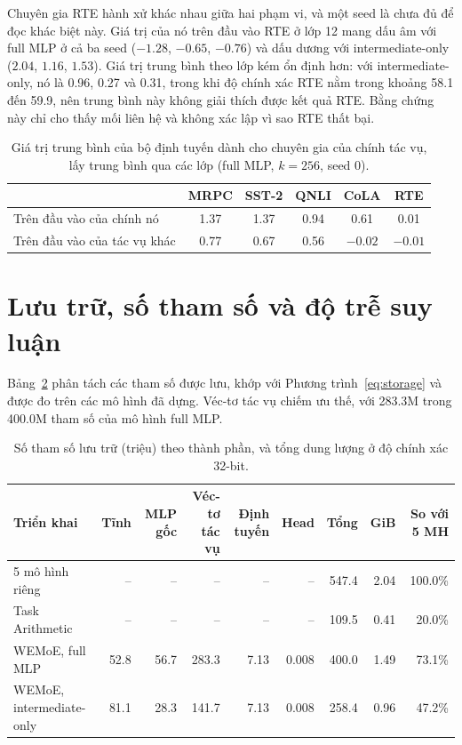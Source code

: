 Chuyên gia RTE hành xử khác nhau giữa hai phạm vi, và một seed là chưa đủ để đọc khác biệt này. Giá trị của nó trên đầu vào RTE ở lớp 12 mang dấu âm với full MLP ở cả ba seed ($-1.28$, $-0.65$, $-0.76$) và dấu dương với intermediate-only ($2.04$, $1.16$, $1.53$). Giá trị trung bình theo lớp kém ổn định hơn: với intermediate-only, nó là 0.96, 0.27 và 0.31, trong khi độ chính xác RTE nằm trong khoảng 58.1 đến 59.9, nên trung bình này không giải thích được kết quả RTE. Bằng chứng này chỉ cho thấy mối liên hệ và không xác lập vì sao RTE thất bại.

\begin{table}[htbp]
  \centering\tablestyle
  \caption{Giá trị trung bình của bộ định tuyến dành cho chuyên gia của chính tác vụ, lấy trung bình qua các lớp (full MLP, $k=256$, seed 0).}
  \label{tab:own}
  \begin{tabular}{l c c c c c}
    \toprule
    & MRPC & SST-2 & QNLI & CoLA & RTE\\
    \midrule
    Trên đầu vào của chính nó & 1.37 & 1.37 & 0.94 & 0.61 & 0.01\\
    Trên đầu vào của tác vụ khác & 0.77 & 0.67 & 0.56 & $-0.02$ & $-0.01$\\
    \bottomrule
  \end{tabular}
\end{table}

\section{Lưu trữ, số tham số và độ trễ suy luận}
\label{sec:efficiency}

Bảng~\ref{tab:storage} phân tách các tham số được lưu, khớp với Phương trình~\eqref{eq:storage} và được đo trên các mô hình đã dựng. Véc-tơ tác vụ chiếm ưu thế, với 283.3M trong 400.0M tham số của mô hình full MLP.

\begin{table}[htbp]
  \centering\tablestyle
  \caption{Số tham số lưu trữ (triệu) theo thành phần, và tổng dung lượng ở độ chính xác 32-bit.}
  \label{tab:storage}
  \setlength{\tabcolsep}{4pt}\begin{tabular}{l r r r r r r r r}
    \toprule
    Triển khai & Tĩnh & MLP gốc & Véc-tơ tác vụ & Định tuyến & Head & Tổng & GiB & So với 5 MH\\
    \midrule
    5 mô hình riêng & -- & -- & -- & -- & -- & 547.4 & 2.04 & 100.0\%\\
    Task Arithmetic & -- & -- & -- & -- & -- & 109.5 & 0.41 & 20.0\%\\
    WEMoE, full MLP & 52.8 & 56.7 & 283.3 & 7.13 & 0.008 & 400.0 & 1.49 & 73.1\%\\
    WEMoE, intermediate-only & 81.1 & 28.3 & 141.7 & 7.13 & 0.008 & 258.4 & 0.96 & 47.2\%\\
    \bottomrule
  \end{tabular}
\end{table}

